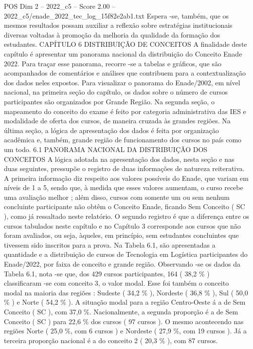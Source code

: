 \begin{textsample}{POS Dim 2 – 2022\_c5 – Score 2.00 – 2022\_c5/enade\_2022\_tec\_log\_15f82e2ab1.txt}
Espera -se, também, que os mesmos resultados possam auxiliar a reflexão sobre estratégias institucionais diversas voltadas à promoção da melhoria da qualidade da formação dos estudantes.
CAPÍTULO 6 DISTRIBUIÇÃO DE CONCEITOS A finalidade deste capítulo é apresentar um panorama nacional da distribuição do Conceito Enade 2022.
Para traçar esse panorama, recorre -se a tabelas e gráficos, que são acompanhados de comentários e análises que contribuem para a contextualização dos dados neles expostos.
Para visualizar o panorama do Enade/2002, em nível nacional, na primeira seção do capítulo, os dados sobre o número de cursos participantes são organizados por Grande Região.
Na segunda seção, o mapeamento do conceito do exame é feito por categoria administrativa das IES e modalidade de oferta dos cursos, de maneira cruzada às grandes regiões.
Na última seção, a lógica de apresentação dos dados é feita por organização acadêmica e, também, grande região de funcionamento dos cursos no país como um todo. 6.1 PANORAMA NACIONAL DA DISTRIBUIÇÃO DOS CONCEITOS A lógica adotada na apresentação dos dados, nesta seção e nas duas seguintes, pressupõe o registro de duas informações de natureza reiterativa.
A primeira informação diz respeito aos valores possíveis do Enade, que variam em níveis de 1 a 5, sendo que, à medida que esses valores aumentam, o curso recebe uma avaliação melhor ; além disso, cursos com somente um ou sem nenhum concluinte participante não obtêm o Conceito Enade, ficando Sem Conceito ( SC ), como já ressaltado neste relatório.
O segundo registro é que a diferença entre os cursos tabulados neste capítulo e no Capítulo 3 corresponde aos cursos que não foram avaliados, ou seja, àqueles, em princípio, sem estudantes concluintes que tivessem sido inscritos para a prova.
Na Tabela 6.1, são apresentadas a quantidade e a distribuição de cursos de Tecnologia em Logística participantes do Enade/2022, por faixa de conceito e grande região.
Observando -se os dados da Tabela 6.1, nota -se que, dos 429 cursos participantes, 164 ( 38,2 \% ) classificaram -se com conceito 3, o valor modal.
Esse foi também o conceito modal na maioria das regiões : Sudeste ( 34,2 \% ), Nordeste ( 36,8 \% ), Sul ( 50,0 \% ) e Norte ( 54,2 \% ).
A situação modal para a região Centro-Oeste á a de Sem Conceito ( SC ), com 37,0 \%.
Nacionalmente, a segunda proporção é a de Sem Conceito ( SC ) para 22,6 \% dos cursos ( 97 cursos ).
O mesmo acontecendo nas regiões Norte ( 25,0 \%, com 6 cursos ) e Nordeste ( 27,9 \%, com 19 cursos ).
Já a terceira proporção nacional é a do conceito 2 ( 20,3 \% ), com 87 cursos.

\end{textsample}
